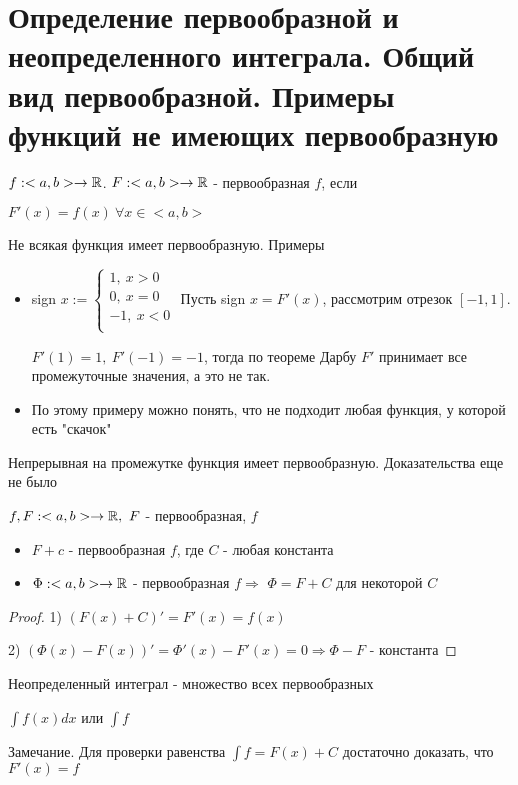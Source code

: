 \section{Определение первообразной и неопределенного интеграла. Общий вид первообразной. Примеры функций не имеющих первообразную}

\begin{conj}
    $f: <a, b> \to \mathbb{R}$. $F:<a, b> \to \mathbb{R}$ - первообразная $f$, если

    $F'(x) = f(x)\ \forall x\in <a, b>$
\end{conj}

Не всякая функция имеет первообразную. Примеры
\begin{itemize}
    \item sign $x:= \begin{cases}
        1,\ x > 0\\
        0,\ x = 0\\
        -1,\ x < 0\\
    \end{cases}$
    Пусть sign $x = F'(x)$, рассмотрим отрезок $[-1, 1]$.

    $F'(1) = 1,\ F'(-1) = -1$, тогда по теореме Дарбу $F'$ принимает все промежуточные значения, а это не так.

    \item По этому примеру можно понять, что не подходит любая функция, у которой есть "скачок"
\end{itemize}

\begin{theorem}
    Непрерывная на промежутке функция имеет первообразную. Доказательства еще не было
\end{theorem}

\begin{theorem}
    $f, F: <a, b> \to \mathbb{R},\ F$ - первообразная, $f$
    \begin{itemize}
        \item $F + c$ - первообразная $f$, где $C$ - любая константа
        \item $\Phi: <a, b> \to \mathbb{R}$ - первообразная $f \Rightarrow$ $\Phi = F+C$ для некоторой $C$
    \end{itemize}
\end{theorem}

\begin{proof}
    1) $(F(x)+C)' = F'(x) = f(x)$
    
    2) $(\Phi(x)-F(x))' = \Phi'(x) - F'(x) = 0 \Rightarrow \Phi - F$ - константа
\end{proof}

\begin{conj}
    Неопределенный интеграл - множество всех первообразных

    $\int f(x) dx$ или $\int f$
\end{conj}

Замечание. Для проверки равенства $\int f = F(x) + C$ достаточно доказать, что $F'(x) = f$